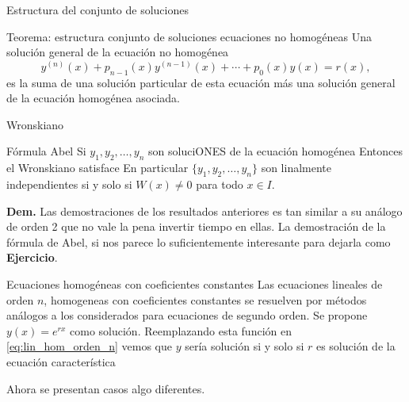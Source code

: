 \documentclass[handout,hyperref={colorlinks=true}]{beamer}
\begin{document}
\begin{frame}{Estructura del conjunto de soluciones}
\begin{block}{Teorema: estructura conjunto de soluciones ecuaciones no homogéneas}
Una solución general de la ecuación no homogénea  
\[y^{(n)}(x)+p_{n-1}(x)y^{(n-1)}(x)+\cdots+p_0(x)y(x)=r(x),\]
es la suma de una solución particular de esta ecuación más una solución general de la ecuación homogénea asociada.
\end{block}

\end{frame}




\begin{frame}{Wronskiano}
\begin{block}{Fórmula Abel}
Si $y_1,y_2,\ldots,y_n$ son soluciONES de la ecuación  homogénea  
Entonces el Wronskiano satisface
En particular  $\{y_1,y_2,\ldots,y_n\}$ son linalmente independientes si y solo si $W(x)\neq 0$ para todo $x\in I$.
\end{block}

\textbf{Dem.} Las demostraciones de los resultados anteriores es tan similar a su análogo de orden 2 que no vale la pena invertir tiempo en ellas. La demostración de la fórmula de Abel, si nos parece lo suficientemente interesante para dejarla como \textbf{Ejercicio}.
\end{frame}


\begin{frame}{Ecuaciones homogéneas con coeficientes constantes}
Las ecuaciones lineales de orden $n$, homogeneas con coeficientes constantes  se resuelven por métodos análogos a los considerados para ecuaciones de segundo orden. Se propone $y(x)=e^{rx}$ como solución. Reemplazando esta función
en \eqref{eq:lin_hom_orden_n} vemos que $y$ sería solución si y solo si $r$ es solución de la ecuación característica
 
Ahora se presentan casos algo diferentes.


\end{frame}
\end{document}
